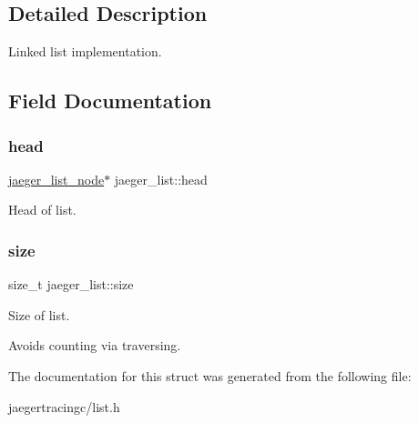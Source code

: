 \subsection{Detailed Description}
Linked list implementation. 



\subsection{Field Documentation}
\mbox{\label{structjaeger__list_ad5a459e896a2bd718d633c63fecf695a}} 
\subsubsection{\texorpdfstring{head}{head}}
{\footnotesize\ttfamily \mbox{\hyperlink{structjaeger__list__node}{jaeger\+\_\+list\+\_\+node}}$\ast$ jaeger\+\_\+list\+::head}



Head of list. 

\mbox{\label{structjaeger__list_a8bb149f40b7a39dcaf99481570f91afc}} 
\subsubsection{\texorpdfstring{size}{size}}
{\footnotesize\ttfamily size\+\_\+t jaeger\+\_\+list\+::size}



Size of list. 

Avoids counting via traversing. 

The documentation for this struct was generated from the following file\+:\begin{DoxyCompactItemize}
\item 
jaegertracingc/list.\+h\end{DoxyCompactItemize}
